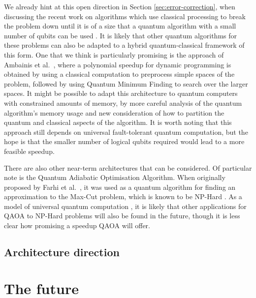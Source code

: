 We already hint at this open direction in Section \ref{sec:error-correction}, when discussing the recent work on algorithms which use classical processing to break the problem down until it is of a size that a quantum algorithm with a small number of qubits can be used \cite{dunjko2018, ge2019}. It is likely that other quantum algorithms for these problems can also be adapted to a hybrid quantum-classical framework of this form. One that we think is particularly promising is the approach of Ambainis et al.~\cite{ambainis2018}, where a polynomial speedup for dynamic programming is obtained by using a classical computation to preprocess simple spaces of the problem, followed by using Quantum Minimum Finding to search over the larger spaces. It might be possible to adapt this architecture to quantum computers with constrained amounts of memory, by more careful analysis of the quantum algorithm's memory usage and new consideration of how to partition the quantum and classical aspects of the algorithm. It is worth noting that this approach still depends on universal fault-tolerant quantum computation, but the hope is that the smaller number of logical qubits required would lead to a more feasible speedup.

There are also other near-term architectures that can be considered. Of particular note is the Quantum Adiabatic Optimisation Algorithm. When originally proposed by Farhi et al.~\cite{farhi2014}, it was used as a quantum algorithm for finding an approximation to the Max-Cut problem, which is known to be NP-Hard \cite{karp1972}. As a model of universal quantum computation \cite{lloyd2018, morales2019}, it is likely that other applications for QAOA to NP-Hard problems will also be found in the future, though it is less clear how promising a speedup QAOA will offer.

\subsection{Architecture direction}

\section{The future}
\label{sec:when}
